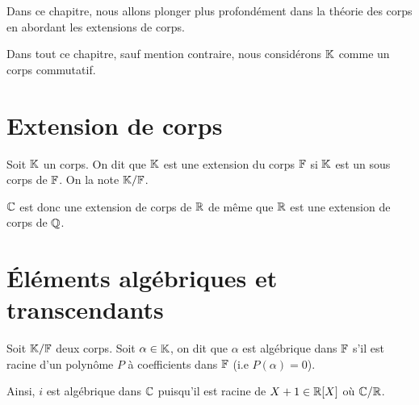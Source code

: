 
\minitoc  %

Dans ce chapitre, nous allons plonger plus profondément dans la théorie des corps en abordant les extensions de corps. 

Dans tout ce chapitre, sauf mention contraire, nous considérons $\mathbb{K}$ comme un corps commutatif. 


\section{Extension de corps}

\begin{definition}
    Soit $\mathbb{K}$ un corps. On dit que $\mathbb{K}$ est une extension du corps $\mathbb{F}$ si $\mathbb{K}$ est un sous corps de $\mathbb{F}$. 
    On la note $\mathbb{K}/\mathbb{F}$. 
\end{definition}

\begin{example}
    $\mathbb{C}$ est donc une extension de corps de $\mathbb{R}$ de même que $\mathbb{R}$ est une extension de corps de $\mathbb{Q}$. 
\end{example}


\section{Éléments algébriques et transcendants}

\begin{definition}
    Soit $\mathbb{K}/\mathbb{F}$ deux corps. Soit $ \alpha \in \mathbb{K}$, on dit que $\alpha$ est algébrique dans $\mathbb{F}$ s'il 
    est racine d'un polynôme $P$ à coefficients dans $\mathbb{F}$ (i.e $P(\alpha) = 0$). 
\end{definition}

\begin{example}
    Ainsi, $i$ est algébrique dans $\mathbb{C}$ puisqu'il est racine de $X+1 \in \mathbb{R}[X]$ où $\mathbb{C}/\mathbb{R}$. 
\end{example}

